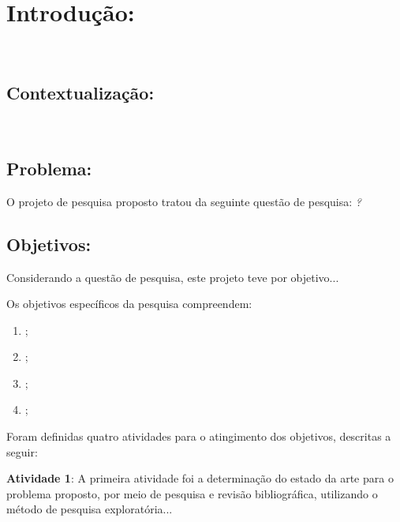 \section{Introdução:}
\label{sec:introducao}

\lipsum[2-4]~\cite{article,proceedings,book}

\subsection{Contextualização:}
\label{subsec:contextualizacao}

\lipsum[2-4]

\citep{inbook}~\lipsum[10-11]

\subsection{Problema:}
\label{subsec:problema}

O projeto de pesquisa proposto tratou da seguinte questão de pesquisa: \textit{\lipsum[1]?}


\subsection{Objetivos:}
\label{subsec:objetivos}

Considerando a questão de pesquisa, este projeto teve por objetivo...\lipsum[1]

Os objetivos específicos da pesquisa compreendem:
\begin{enumerate}
    \item \lipsum[1][1-2];
    \item \lipsum[1][3-4];
    \item \lipsum[1][5-6];
    \item \lipsum[1][7-8];
\end{enumerate}

Foram definidas quatro atividades para o atingimento dos objetivos, descritas a seguir:

 \label{par:atividade1}
\textbf{Atividade 1}: A primeira atividade foi a determinação do estado da arte para o problema proposto, por meio de pesquisa e revisão bibliográfica, utilizando o método de pesquisa exploratória...\lipsum[1][10-20]~\cite{manual}

